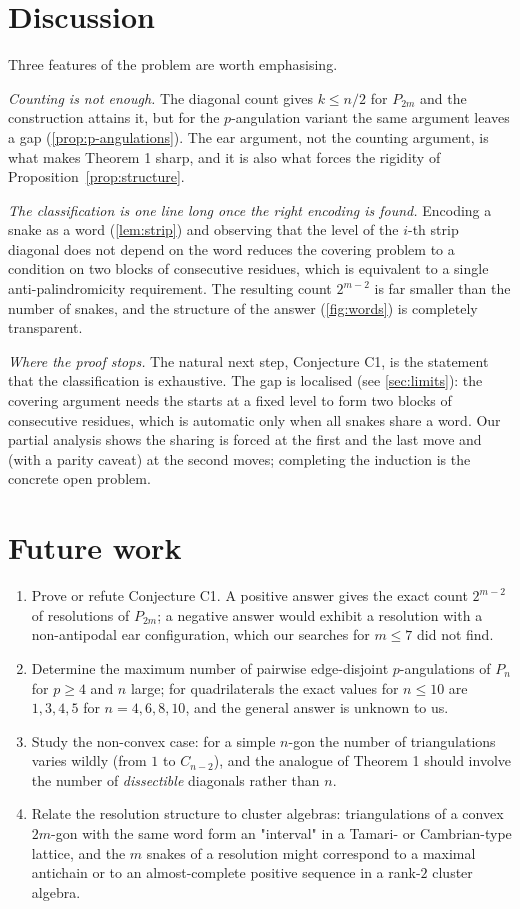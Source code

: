 \documentclass[11pt,a4paper]{article}
\theoremstyle{definition}
\theoremstyle{remark}
\begin{document}
\section{Discussion}

Three features of the problem are worth emphasising.

\emph{Counting is not enough.}  The diagonal count gives $k\le n/2$ for $P_{2m}$ and the
construction attains it, but for the $p$-angulation variant the same argument leaves a gap
(\cref{prop:p-angulations}).  The ear argument, not the counting argument, is what makes
Theorem 1 sharp, and it is also what forces the rigidity of Proposition~\ref{prop:structure}.

\emph{The classification is one line long once the right encoding is found.}  Encoding a
snake as a word (\cref{lem:strip}) and observing that the level of the $i$-th strip diagonal
does not depend on the word reduces the covering problem to a condition on two blocks of
consecutive residues, which is equivalent to a single anti-palindromicity requirement.  The
resulting count $2^{m-2}$ is far smaller than the number of snakes, and the structure of the
answer (\cref{fig:words}) is completely transparent.

\emph{Where the proof stops.}  The natural next step, Conjecture C1, is the statement that
the classification is exhaustive.  The gap is localised (see \cref{sec:limits}): the
covering argument needs the starts at a fixed level to form two blocks of consecutive
residues, which is automatic only when all snakes share a word.  Our partial analysis shows
the sharing is forced at the first and the last move and (with a parity caveat) at the
second moves; completing the induction is the concrete open problem.

\section{Future work}

\begin{enumerate}
\item Prove or refute Conjecture C1.  A positive answer gives the exact count $2^{m-2}$ of
resolutions of $P_{2m}$; a negative answer would exhibit a resolution with a non-antipodal
ear configuration, which our searches for $m\le7$ did not find.
\item Determine the maximum number of pairwise edge-disjoint $p$-angulations of $P_n$ for
$p\ge4$ and $n$ large; for quadrilaterals the exact values for $n\le10$ are $1,3,4,5$ for
$n=4,6,8,10$, and the general answer is unknown to us.
\item Study the non-convex case: for a simple $n$-gon the number of triangulations varies
wildly (from $1$ to $C_{n-2}$), and the analogue of Theorem 1 should involve the number of
\emph{dissectible} diagonals rather than $n$.
\item Relate the resolution structure to cluster algebras: triangulations of a convex
$2m$-gon with the same word form an "interval" in a Tamari- or Cambrian-type lattice, and
the $m$ snakes of a resolution might correspond to a maximal antichain or to an
almost-complete positive sequence in a rank-$2$ cluster algebra.
\end{enumerate}
\end{document}

